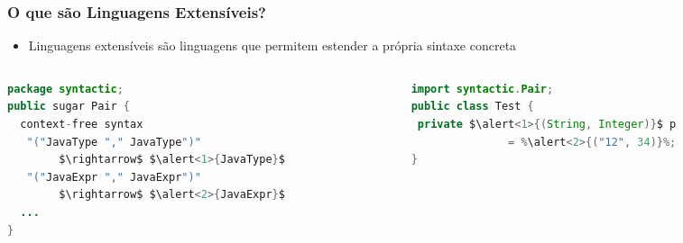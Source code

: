 \documentclass{beamer}
\begin{document}
\begin{frame}[fragile]
  \frametitle{O que são Linguagens Extensíveis?}
  \begin{itemize}
    \item Linguagens extensíveis são linguagens que permitem estender a própria sintaxe concreta
  \end{itemize}
    \begin{columns}[!ht]
    \begin{column}{5.5cm}
\begin{lstlisting}[language=java,
                   frame=bottomline,title={SugarJ defining syntax}]
package syntactic;
public sugar Pair {
  context-free syntax
   "("JavaType "," JavaType")"
        $\rightarrow$ $\alert<1>{JavaType}$
   "("JavaExpr "," JavaExpr")"
        $\rightarrow$ $\alert<2>{JavaExpr}$
  ...
}
\end{lstlisting}
    \end{column}
    \begin{column}{5.5cm}
\begin{lstlisting}[language=java,frame=bottomline,title={Using Pair syntax},escapechar=\%]
import syntactic.Pair;
public class Test {
 private $\alert<1>{(String, Integer)}$ p
               = %\alert<2>{("12", 34)}%;
}
\end{lstlisting}
    \end{column}
  \end{columns}
\end{frame}

\end{document}
